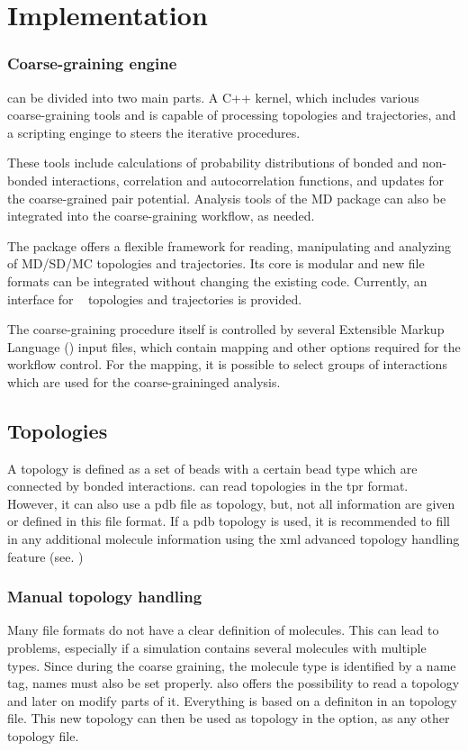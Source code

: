 \chapter{Implementation}
\subsection{Coarse-graining engine}
\votca can be divided into two main parts. A C++ kernel, which includes various coarse-graining tools and is capable of processing topologies and trajectories, and a scripting enginge to steers the iterative procedures.

These tools include calculations of probability distributions of bonded and non-bonded interactions, correlation and autocorrelation functions, and updates for the coarse-grained pair potential. Analysis tools of the MD package can also be integrated into the coarse-graining workflow, as needed.

The package offers a flexible framework for reading, manipulating and analyzing of MD/SD/MC topologies and trajectories. Its core is modular and new file formats can be integrated without changing the existing code. Currently, an interface for \gromacs~\cite{gromacs4} topologies and trajectories is provided.

The coarse-graining procedure itself is controlled by several Extensible Markup Language (\xml) input files, which contain mapping and other options required for the workflow control. For the mapping, it is possible to select groups of interactions which are used for the coarse-graininged analysis. 



\section{Topologies}
A topology is defined as a set of beads with a certain bead type which are connected by bonded interactions.
\votca can read topologies in the \gromacs tpr format. However, it can also use a pdb file as topology, but, not all information are given or defined in this file format. If a pdb topology is used, it is recommended to fill in any additional molecule information using the xml advanced topology handling feature (see. )
\subsection{Manual topology handling}
\label{sec:adv_topology}
Many file formats do not have a clear definition of molecules. This can lead to problems, especially if a simulation contains several molecules with multiple types. Since during the coarse graining, the molecule type is identified by a name tag, names must also be set properly. \votca also offers the possibility to read a topology and later on modify parts of it. Everything is based on a definiton in an \xml topology file. This new \xml topology can then be used as topology in the  option, as any other topology file. 


